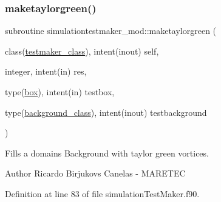 \subsubsection{\texorpdfstring{maketaylorgreen()}{maketaylorgreen()}}
{\footnotesize\ttfamily subroutine simulationtestmaker\+\_\+mod\+::maketaylorgreen (\begin{DoxyParamCaption}\item[{class(\mbox{\hyperlink{structsimulationtestmaker__mod_1_1testmaker__class}{testmaker\+\_\+class}}), intent(inout)}]{self,  }\item[{integer, intent(in)}]{res,  }\item[{type(\mbox{\hyperlink{structgeometry__mod_1_1box}{box}}), intent(in)}]{testbox,  }\item[{type(\mbox{\hyperlink{structbackground__mod_1_1background__class}{background\+\_\+class}}), intent(inout)}]{testbackground }\end{DoxyParamCaption})\hspace{0.3cm}{\ttfamily [private]}}



Fills a domain\textquotesingle{}s Background with taylor green vortices. 

\begin{DoxyAuthor}{Author}
Ricardo Birjukovs Canelas -\/ M\+A\+R\+E\+T\+EC 
\end{DoxyAuthor}


Definition at line 83 of file simulation\+Test\+Maker.\+f90.


